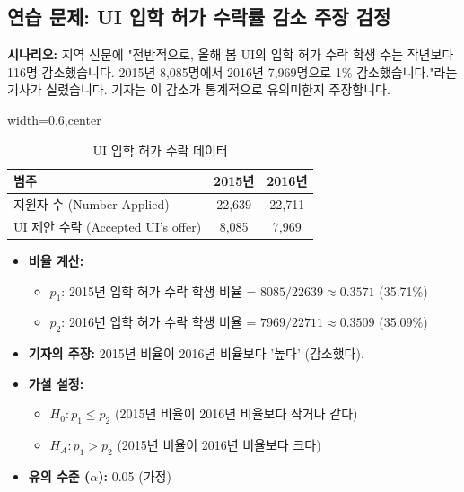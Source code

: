 \documentclass[11pt,a4paper]{article}
\begin{document}
\subsection*{연습 문제: UI 입학 허가 수락률 감소 주장 검정}
\begin{examplebox}
\textbf{시나리오:}
지역 신문에 "전반적으로, 올해 봄 UI의 입학 허가 수락 학생 수는 작년보다 116명 감소했습니다. 2015년 8,085명에서 2016년 7,969명으로 1\% 감소했습니다."라는 기사가 실렸습니다. 기자는 이 감소가 통계적으로 유의미한지 주장합니다.
\end{examplebox}

\begin{table}[h!]
\caption{UI 입학 허가 수락 데이터}
\label{tab:ui_admission_data}
\centering
\begin{adjustbox}{width=0.6\textwidth,center}
\begin{tabular}{lcc}
\toprule
\textbf{범주} & \textbf{2015년} & \textbf{2016년} \\
\midrule
지원자 수 (Number Applied) & 22,639 & 22,711 \\
UI 제안 수락 (Accepted UI's offer) & 8,085 & 7,969 \\
\bottomrule
\end{tabular}
\end{adjustbox}
\end{table}

\begin{itemize}
    \item \textbf{비율 계산:}
    \begin{itemize}
        \item $p_1$: 2015년 입학 허가 수락 학생 비율 = $8085 / 22639 \approx 0.3571$ (35.71\%)
        \item $p_2$: 2016년 입학 허가 수락 학생 비율 = $7969 / 22711 \approx 0.3509$ (35.09\%)
    \end{itemize}
    \item \textbf{기자의 주장:} 2015년 비율이 2016년 비율보다 '높다' (감소했다).
    \item \textbf{가설 설정:}
    \begin{itemize}
        \item $H_0: p_1 \le p_2$ (2015년 비율이 2016년 비율보다 작거나 같다)
        \item $H_A: p_1 > p_2$ (2015년 비율이 2016년 비율보다 크다)
    \end{itemize}
    \item \textbf{유의 수준 ($\alpha$):} 0.05 (가정)
\end{itemize}
\end{document}
